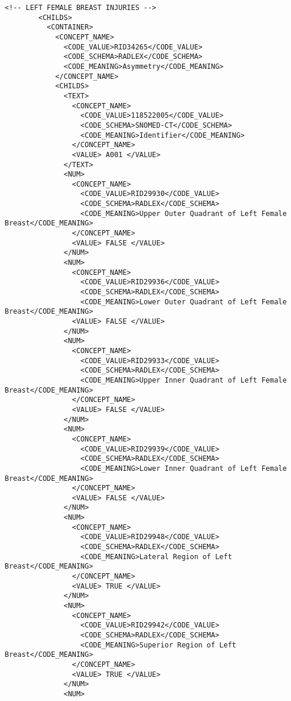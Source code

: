 \begin{lstlisting}[label=dicom-report,caption=Informe estructurado de una exploración de mama]
        <!-- LEFT FEMALE BREAST INJURIES -->
        <CHILDS>
          <CONTAINER>
            <CONCEPT_NAME>
              <CODE_VALUE>RID34265</CODE_VALUE>
              <CODE_SCHEMA>RADLEX</CODE_SCHEMA>
              <CODE_MEANING>Asymmetry</CODE_MEANING>
            </CONCEPT_NAME>
            <CHILDS>
              <TEXT>
                <CONCEPT_NAME>
                  <CODE_VALUE>118522005</CODE_VALUE>
                  <CODE_SCHEMA>SNOMED-CT</CODE_SCHEMA>
                  <CODE_MEANING>Identifier</CODE_MEANING>
                </CONCEPT_NAME>
                <VALUE> A001 </VALUE>
              </TEXT>
              <NUM>
                <CONCEPT_NAME>
                  <CODE_VALUE>RID29930</CODE_VALUE>
                  <CODE_SCHEMA>RADLEX</CODE_SCHEMA>
                  <CODE_MEANING>Upper Outer Quadrant of Left Female Breast</CODE_MEANING>
                </CONCEPT_NAME>
                <VALUE> FALSE </VALUE>
              </NUM>
              <NUM>
                <CONCEPT_NAME>
                  <CODE_VALUE>RID29936</CODE_VALUE>
                  <CODE_SCHEMA>RADLEX</CODE_SCHEMA>
                  <CODE_MEANING>Lower Outer Quadrant of Left Female Breast</CODE_MEANING>
                <VALUE> FALSE </VALUE>
              </NUM>
              <NUM>
                <CONCEPT_NAME>
                  <CODE_VALUE>RID29933</CODE_VALUE>
                  <CODE_SCHEMA>RADLEX</CODE_SCHEMA>
                  <CODE_MEANING>Upper Inner Quadrant of Left Female Breast</CODE_MEANING>
                </CONCEPT_NAME>
                <VALUE> FALSE </VALUE>
              </NUM>
              <NUM>
                <CONCEPT_NAME>
                  <CODE_VALUE>RID29939</CODE_VALUE>
                  <CODE_SCHEMA>RADLEX</CODE_SCHEMA>
                  <CODE_MEANING>Lower Inner Quadrant of Left Female Breast</CODE_MEANING>
                </CONCEPT_NAME>
                <VALUE> FALSE </VALUE>
              </NUM>
              <NUM>
                <CONCEPT_NAME>
                  <CODE_VALUE>RID29948</CODE_VALUE>
                  <CODE_SCHEMA>RADLEX</CODE_SCHEMA>
                  <CODE_MEANING>Lateral Region of Left Breast</CODE_MEANING>
                </CONCEPT_NAME>
                <VALUE> TRUE </VALUE>
              </NUM>
              <NUM>
                <CONCEPT_NAME>
                  <CODE_VALUE>RID29942</CODE_VALUE>
                  <CODE_SCHEMA>RADLEX</CODE_SCHEMA>
                  <CODE_MEANING>Superior Region of Left Breast</CODE_MEANING>
                </CONCEPT_NAME>
                <VALUE> TRUE </VALUE>
              </NUM>
              <NUM>

\end{lstlisting}
